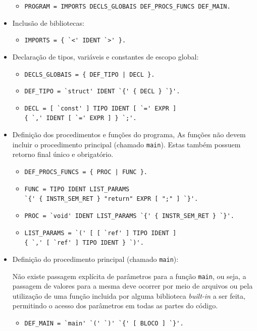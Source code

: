 \begin{itemize}
        \begin{itemize}
            \item \verb$PROGRAM = IMPORTS DECLS_GLOBAIS DEF_PROCS_FUNCS DEF_MAIN.$
        \end{itemize}
    \item Inclusão de bibliotecas:
        \begin{itemize}
            \item \verb$IMPORTS = { `<' IDENT `>' }.$
        \end{itemize}
    \item Declaração de tipos, variáveis e constantes de escopo global:
        \begin{itemize}
            \item \verb$DECLS_GLOBAIS = { DEF_TIPO | DECL }.$
            \item \verb$DEF_TIPO = `struct' IDENT `{' { DECL } `}'.$
            \item \verb$DECL = [ `const' ] TIPO IDENT [ `=' EXPR ]$\\
                    \verb${ `,' IDENT [ `=' EXPR ] } `;'.$
        \end{itemize}
    \item Definição dos procedimentos e funções do programa, 
        As funções não devem incluir o procedimento principal (chamado
        \verb!main!). Estas também possuem retorno final único e obrigatório. 
        \begin{itemize}
            \item \verb$DEF_PROCS_FUNCS = { PROC | FUNC }.$
            \item \verb$FUNC = TIPO IDENT LIST_PARAMS$\\
                    \verb$`{' { INSTR_SEM_RET } "return" EXPR [ ";" ] `}'.$
            \item \verb$PROC = `void' IDENT LIST_PARAMS `{' { INSTR_SEM_RET } `}'.$
            \item \verb$LIST_PARAMS = `(' [ [ `ref' ] TIPO IDENT ]$\\
                    \verb${ `,' [ `ref' ] TIPO IDENT } `)'.$
        \end{itemize}
    \item Definição do procedimento principal (chamado \verb!main!):
            
            Não existe
            passagem explícita de parâmetros para a função \verb!main!, ou seja,
            a passagem de valores para a mesma deve ocorrer por meio de
            arquivos ou pela utilização de uma função incluida por alguma
            biblioteca \emph{built-in} a ser feita, permitindo o acesso dos
            parâmetros em todas as partes do código. 
        \begin{itemize}
            \item \verb$DEF_MAIN = `main' `(' `)' `{' [ BLOCO ] `}'.$
        \end{itemize}
\end{itemize}


